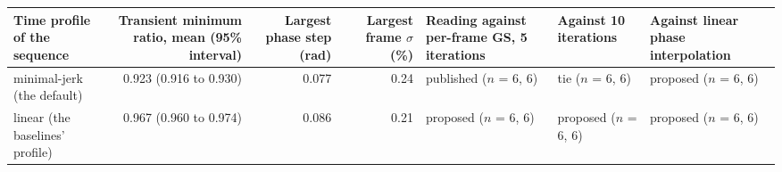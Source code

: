\begin{tabular}{@{}l r r r l l l@{}}
\toprule
Time profile of the sequence & Transient minimum ratio, mean (95\% interval) & Largest phase step (rad) & Largest frame $\sigma$ (\%) & Reading against per-frame GS, 5 iterations & Against 10 iterations & Against linear phase interpolation \\
\midrule
minimal-jerk (the default) & 0.923 (0.916 to 0.930) & 0.077 & 0.24 & published ($n$ = 6, 6) & tie ($n$ = 6, 6) & proposed ($n$ = 6, 6) \\
linear (the baselines' profile) & 0.967 (0.960 to 0.974) & 0.086 & 0.21 & proposed ($n$ = 6, 6) & proposed ($n$ = 6, 6) & proposed ($n$ = 6, 6) \\
\bottomrule
\end{tabular}
